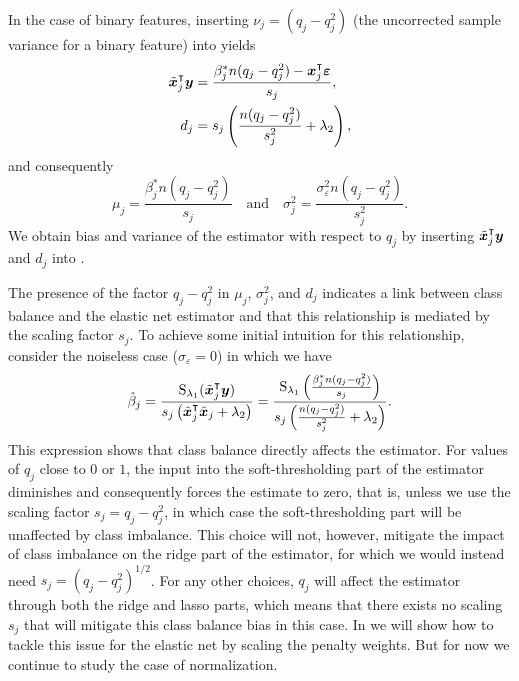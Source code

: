 In the case of binary features, inserting \(\nu_j = (q_j - q_j^2)\) (the uncorrected sample
variance for a binary feature) into  yields
\begin{align*}
  \tilde{\boldsymbol{x}}_j^\intercal \boldsymbol{y} & = \frac{\beta_j^* n(q_j - q_j^2) - \boldsymbol{x}_j^\intercal \boldsymbol{\varepsilon}}{s_j}, \\
  d_j                          & = s_j \left(\frac{n(q_j - q_j^2)}{s_j^2} + \lambda_2\right),
\end{align*}
and consequently
\[
  \mu_j = \frac{\beta^*_j n(q_j - q_j^2)}{s_j}\quad \text{and} \quad \sigma_j^2 = \frac{\sigma_\varepsilon^2n(q_j- q_j^2)}{s^2_j}.
\]
%
We obtain bias and variance of the estimator with respect to \(q_j\) by inserting
\(\tilde{\boldsymbol{x}}_j^\intercal \boldsymbol{y}\) and \(d_j\) into .

The presence of the factor \(q_j - q_j^2\) in \(\mu_j\), \(\sigma_j^2\), and \(d_j\)
indicates a link between class balance and the elastic net estimator and that this
relationship is mediated by the scaling factor \(s_j\). To achieve some initial intuition
for this relationship, consider the noiseless case (\(\sigma_\varepsilon = 0\)) in which we
have
\begin{equation}
  \label{eq:noiseless-estimator}
  \hat{\beta}_j = \frac{\operatorname{S}_{\lambda_1}(\tilde{\boldsymbol{x}}_j^\intercal \boldsymbol{y})}{s_j\left(\tilde{\boldsymbol{x}}_j^\intercal \tilde{\boldsymbol{x}}_j + \lambda_2\right)}
  =
  \frac{\operatorname{S}_{\lambda_1}\left(\frac{\beta_j^* n (q_j - q_j^2)}{s_j}\right)}{s_j\left(\frac{n(q_j - q_j^2)}{s_j^2} + \lambda_2\right)}.
\end{equation}
%
This expression shows that class balance directly affects the estimator. For values of
\(q_j\) close to \(0\) or \(1\), the input into the soft-thresholding part of the estimator
diminishes and consequently forces the estimate to zero, that is, unless we use the scaling
factor \(s_j = q_j - q_j^2\), in which case the soft-thresholding part will be unaffected
by class imbalance. This choice will not, however, mitigate the impact of class imbalance
on the ridge part of the estimator, for which we would instead need \(s_j = (q_j -
q_j^2)^{1/2}\). For any other choices, \(q_j\) will affect the estimator through both the
ridge and lasso parts, which means that there exists no scaling \(s_j\) that will mitigate
this class balance bias in this case. In  we will show how to
tackle this issue for the elastic net by scaling the penalty weights. But for now we
continue to study the case of normalization.

